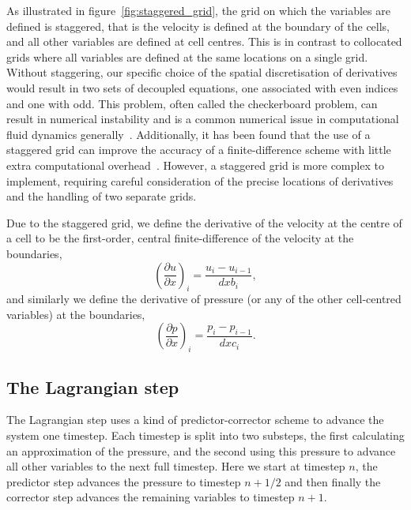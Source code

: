 As illustrated in figure~\ref{fig:staggered_grid}, the grid on which the variables are defined is staggered, that is the velocity is defined at the boundary of the cells, and all other variables are defined at cell centres. This is in contrast to collocated grids where all variables are defined at the same locations on a single grid. Without staggering, our specific choice of the spatial discretisation of derivatives would result in two sets of decoupled equations, one associated with even indices and one with odd. This problem, often called the checkerboard problem, can result in numerical instability and is a common numerical issue in computational fluid dynamics generally~\cite{ferzigerComputationalMethodsFluid2002}. Additionally, it has been found that the use of a staggered grid can improve the accuracy of a finite-difference scheme with little extra computational overhead~\cite{rojanaratanangkulePerformanceHighOrder2015}. However, a staggered grid is more complex to implement, requiring careful consideration of the precise locations of derivatives and the handling of two separate grids. 

Due to the staggered grid, we define the derivative of the velocity at the centre of a cell to be the first-order, central finite-difference of the velocity at the boundaries,
\begin{equation}
  {\left( \frac{\partial u}{\partial x} \right)}_i = \frac{u_i - u_{i-1}}{dxb_i},
  \label{}
\end{equation}
and similarly we define the derivative of pressure (or any of the other cell-centred variables) at the boundaries,
\begin{equation}
  {\left( \frac{\partial p}{\partial x} \right)}_i = \frac{p_i - p_{i-1}}{dxc_i}.
  \label{}
\end{equation}

\subsection{The Lagrangian step}
The Lagrangian step uses a kind of predictor-corrector scheme to advance the system one timestep. Each timestep is split into two substeps, the first calculating an approximation of the pressure, and the second using this pressure to advance all other variables to the next full timestep. Here we start at timestep $n$, the predictor step advances the pressure to timestep $n+1/2$ and then finally the corrector step advances the remaining variables to timestep $n+1$.

